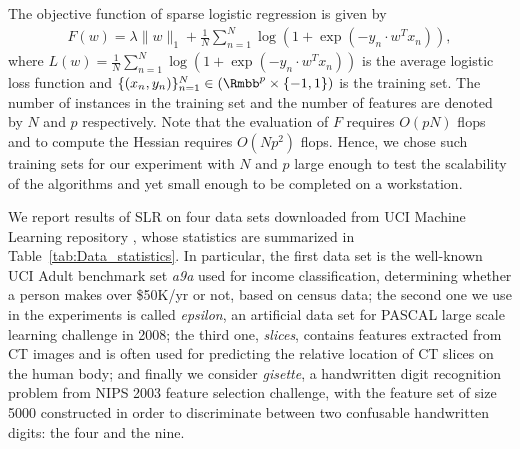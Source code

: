 \documentclass[11pt]{article}
\numberwithin{equation}{section}
\begin{document}

The objective function of sparse logistic regression is given by
\begin{align*}
    F(w) = \lambda \|w\|_1 + \frac{1}{N} \sum_{n=1}^N \log(1 + \exp(-y_n \cdot w^Tx_n)),
\end{align*}
where $L(w) = \frac{1}{N} \sum_{n=1}^N \log(1 + \exp(-y_n \cdot w^Tx_n))$ is the
average logistic loss function and $ \{ ( x_n, y_n ) \}^N_{n=1} \in ( \Rmbb^p \times \{-1,1\} ) $ is the training set. The number of instances in the training set and the number of features are denoted by $N$ and $p$ respectively. Note that the evaluation of $F$ requires $O(pN)$ flops and  to compute the Hessian requires $O(Np^2)$ flops. Hence, we chose such training sets for our experiment with $N$ and $p$  large enough to test the scalability of the algorithms and yet small enough to be completed on a workstation. 

We report results of SLR on four data sets downloaded from UCI Machine Learning repository \cite{Bache+Lichman:2013}, whose statistics are summarized in Table~\ref{tab:Data_statistics}. In particular, the first data set is the well-known UCI Adult benchmark set \emph{a9a} used for income classification, determining whether a person makes over \$50K/yr or not, based on census data; the second one we use in the experiments is called \emph{epsilon}, an artificial data set for PASCAL large scale learning challenge in 2008; 
the third one, \emph{slices}, contains features extracted from CT images and is often used for predicting the relative location of CT slices on the human body; and finally we consider \emph{gisette}, a handwritten digit recognition problem from NIPS 2003 feature selection challenge, with the feature set of size 5000 constructed in order to discriminate between two confusable handwritten digits: the four and the nine. 
\end{document}
